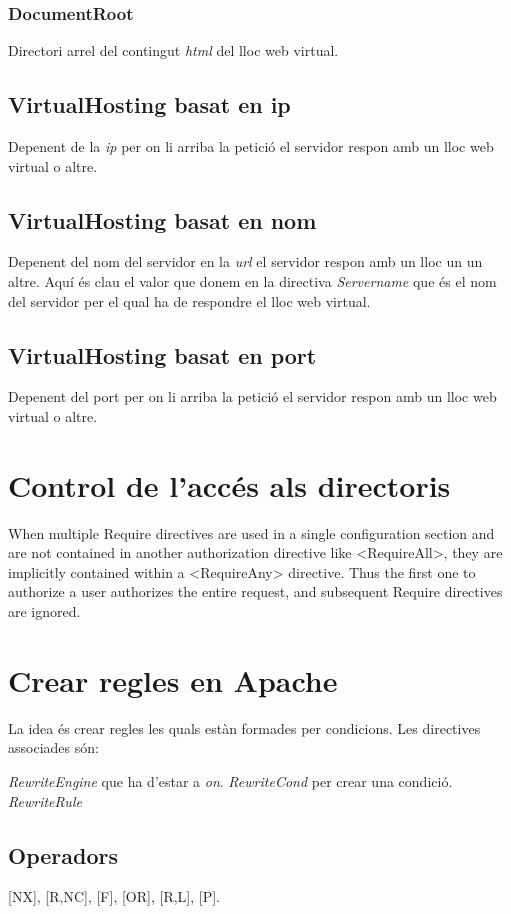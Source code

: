 \documentclass[a4paper, 11pt]{article}
\begin{document}
\subsubsection{DocumentRoot}
Directori arrel del contingut \textit{html} del lloc web virtual.
\subsection{VirtualHosting basat en ip}
Depenent de la \textit{ip} per on li arriba la petició el servidor respon amb un lloc web virtual o altre. 
\subsection{VirtualHosting basat en nom}
Depenent del nom del servidor en la \textit{url} el servidor respon amb un lloc un un altre. Aquí és clau el valor que donem en la directiva \textit{Servername} que és el nom del servidor per el qual ha de respondre el lloc web virtual.
\subsection{VirtualHosting basat en port}
Depenent del port per on li arriba la petició el servidor respon amb un lloc web virtual o altre. 

\section{Control de l'acc\'es als directoris}

When multiple Require directives are used in a single configuration section and
are not contained in another authorization directive like <RequireAll>, they are
implicitly contained within a <RequireAny> directive. Thus the first one to
authorize a user authorizes the entire request, and subsequent Require directives
are ignored.

\section{Crear regles en Apache}
La idea és crear regles les quals estàn formades per condicions. Les directives associades són:
\begin{itemize}
    \textit{RewriteEngine} que ha d'estar a \textit{on}.
    \textit{RewriteCond} per crear una condició.
    \textit{RewriteRule}
\end{itemize}
\subsection{Operadors}
[NX], [R,NC], [F], [OR], [R,L], [P].
\end{document}
